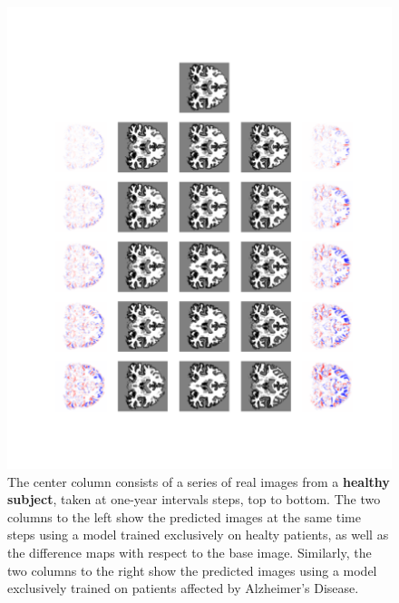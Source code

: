 \begin{figure}
	\centering
	\includegraphics[width=\linewidth, trim={100 100 66 30}, clip]{images/HC_AD_plots/comp_ADNI_137014}
	\vspace*{-15pt}
	\caption{The center column consists of a series of real images from a \textbf{healthy subject}, taken at one-year intervals steps, top to bottom. The two columns to the left show the predicted images at the same time steps using a model trained exclusively on healty patients, as well as the difference maps with respect to the base image. Similarly, the two columns to the right show the predicted images using a model exclusively trained on patients affected by Alzheimer's Disease.}
	\label{fig:hcad_hc}
\end{figure}




